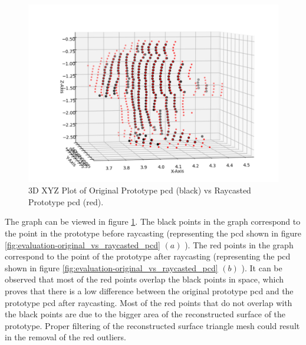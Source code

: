 \begin{figure}[htbp]
    \centering
    \includegraphics[width=0.8\linewidth]{97_graphics/evaluation/3dxyz_plot.pdf}
    \caption{3D XYZ Plot of Original Prototype \acrshort{pcd} (black) vs Raycasted Prototype \acrshort{pcd} (red).}
    \label{fig:evaluation_3dplot}
\end{figure}

The graph can be viewed in figure \ref{fig:evaluation_3dplot}. The black points in the graph correspond to the point in the prototype before raycasting (representing the \acrshort{pcd} shown in figure \ref{fig:evaluation-original_vs_raycasted_pcd} \((a)\) ). The red points in the graph correspond to the point of the prototype after raycasting (representing the \acrshort{pcd} shown in figure \ref{fig:evaluation-original_vs_raycasted_pcd} \((b)\) ). It can be observed that most of the red points overlap the black points in space, which proves that there is a low difference between the original prototype \acrshort{pcd} and the prototype \acrshort{pcd} after raycasting. Most of the red points that do not overlap with the black points are due to the bigger area of the reconstructed surface of the prototype. Proper filtering of the reconstructed surface triangle mesh could result in the removal of the red outliers.

